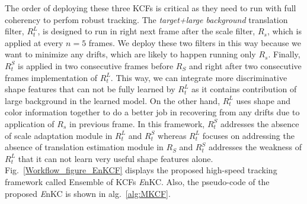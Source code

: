 \documentclass{bmvc2k}
\begin{document}
The order of deploying these three KCFs is critical as they need to run with full coherency to perfom robust tracking. The \textit{target+large background} translation filter, $R_{t}^{L}$, is designed to run in right next frame after the scale filter, $R_s$, which is applied at every $n=5$ frames. We deploy these two filters in this way because we want to minimize any drifts, which are likely to happen running only $R_{s}$. Finally, $R_{t}^{S}$ is applied in two consecutive frames before $R_{S}$ and right after two consecutive frames implementation of $R_{t}^{L}$. This way, we can integrate more discriminative shape features that can not be fully learned by $R_{t}^{L}$ as it contains contribution of large background in the learned model. On the other hand, $R_{t}^{L}$ uses shape and color information together to do a better job in recovering from any drifts due to application of $R_{s}$ in previous frame. In this framework, $R_{t}^{S}$ addresses the absence of scale adaptation module in $R_{t}^{L}$ and $R_{t}^{S}$ whereas $R_{t}^{L}$ focuses on addressing the absence of translation estimation module in $R_{S}$ and $R_{t}^{S}$ addresses the weakness of $R_{t}^{L}$ that it can not learn very useful shape features alone. Fig.~\ref{Workflow_figure_EnKCF} displays the proposed high-speed tracking framework called Ensemble of KCFs {\it E}nKC. Also, the pseudo-code of
the proposed {\it E}nKC is shown in alg.~\ref{alg:MKCF}.
\end{document}
